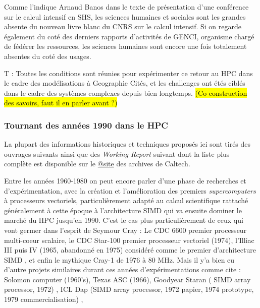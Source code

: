 Comme l'indique Arnaud Banos dans le texte de présentation d'une conférence sur le calcul intensif en SHS, les sciences humaines et sociales sont les grandes absente du nouveau livre blanc du CNRS sur le calcul intensif. Si on regarde également du coté des derniers rapports d'activités de GENCI, organisme chargé de fédérer les ressources, les sciences humaines sont encore une fois totalement absentes du coté des usages.

T : Toutes les conditions sont réunies pour expérimenter ce retour au HPC dans le cadre des modélisations à Geographie Cités, et les challenges ont étés ciblés dans le cadre des systèmes complexes depuis bien longtemps. \hl{(Co construction des savoirs, faut il en parler avant ?)}

\subsubsection{Tournant des années 1990 dans le HPC}

La plupart des informations historiques et techniques proposés ici sont tirés des ouvrages suivants \autocites{Fox1994, Fox1988, Seitz1985, CM2-1990, Lerman1993, Padua2011, Dietrich1984}[81-84]{Culler1998, Steele2011} ainsi que des \textit{Working Report} suivant \autocites{Athas1987, Su1987, Seitz1983, Seitz1984a, Seitz1984b} dont la liste plus complète est disponible sur le \href{http://authors.library.caltech.edu/view/person-az/Seitz-C-L.html}{@site} des archives de Caltech.

Entre les années 1960-1980 on peut encore parler d'une phase de recherches et d'expérimentation, avec la création et l'amélioration des premiers \textit{supercomputers} à processeurs vectoriels, particulièrement adapté au calcul scientifique rattaché généralement à cette époque à l'architecture SIMD  qui va ensuite dominer le marché du HPC jusqu'en 1990. C'est le cas plus particulièrement de ceux qui vont germer dans l'esprit de Seymour Cray : Le CDC 6600 premier processeur multi-coeur scalaire, le CDC Star-100 premier processeur vectoriel (1974), l'Illiac III puis IV (1965, abandonné en 1975) considéré comme le premier d'architecture SIMD \autocite{Muraoka2012}, et enfin le mythique Cray-1 de 1976 à  80 MHz. Mais il y'a bien eu d'autre projets similaires durant ces années d'expérimentations comme cite \textcite[387-388]{Steele2011} : Solomon computer (1960's), Texas ASC (1966), Goodyear Staran ( SIMD array processor, 1972) , ICL Dap (SIMD array processor, 1972 papier, 1974 prototype, 1979 commercialisation) , %

